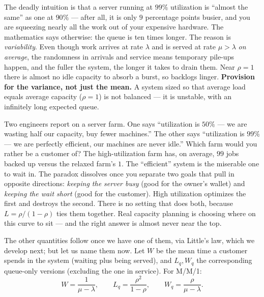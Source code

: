 \begin{trapbox}
The deadly intuition is that a server running at $99\%$ utilization is ``almost the same'' as one at
$90\%$ --- after all, it is only $9$ percentage points busier, and you are squeezing nearly all the
work out of your expensive hardware. The mathematics says otherwise: the queue is ten times longer.
The reason is \emph{variability}. Even though work arrives at rate $\lambda$ and is served at rate
$\mu > \lambda$ \emph{on average}, the randomness in arrivals and service means temporary pile-ups
happen, and the fuller the system, the longer it takes to drain them. Near $\rho = 1$ there is almost
no idle capacity to absorb a burst, so backlogs linger. \textbf{Provision for the variance, not just
the mean.} A system sized so that average load equals average capacity ($\rho = 1$) is not balanced
--- it is unstable, with an infinitely long expected queue.
\end{trapbox}

\begin{paradoxbox}
Two engineers report on a server farm. One says ``utilization is $50\%$ --- we are wasting half our
capacity, buy fewer machines.'' The other says ``utilization is $99\%$ --- we are perfectly
efficient, our machines are never idle.'' Which farm would you rather be a customer of? The
high-utilization farm has, on average, $99$ jobs backed up versus the relaxed farm's $1$. The
``efficient'' system is the miserable one to wait in. The paradox dissolves once you separate two
goals that pull in opposite directions: \emph{keeping the server busy} (good for the owner's
wallet) and \emph{keeping the wait short} (good for the customer). High utilization optimizes the
first and destroys the second. There is no setting that does both, because $L = \rho/(1-\rho)$ ties
them together. Real capacity planning is choosing where on this curve to sit --- and the right answer
is almost never near the top.
\end{paradoxbox}

The other quantities follow once we have one of them, via Little's law, which we develop next; but
let us name them now. Let $W$ be the mean time a customer spends in the system (waiting plus being
served), and $L_q, W_q$ the corresponding queue-only versions (excluding the one in service). For
M/M/1:
\[
  W = \frac{1}{\mu - \lambda}, \qquad
  L_q = \frac{\rho^2}{1-\rho}, \qquad
  W_q = \frac{\rho}{\mu - \lambda}.
\]

